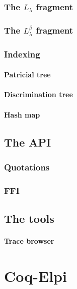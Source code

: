 \documentclass[a4paper, 11pt]{book}
\begin{document}
\cite{dunchev15lpar}

\subsection{The $L_{\lambda}$ fragment}
\subsection{The $L_{\lambda}^{\beta}$ fragment}

\cite{Michaylov1993HigherOrderLP}

\subsection{Indexing}
\subsubsection{Patricial tree}
\subsubsection{Discrimination tree}
\subsubsection{Hash map}

\section{The API}

\subsection{Quotations}
\subsection{FFI}
\section{The tools}

\subsubsection{Trace browser}

\chapter{Coq-Elpi}
\end{document}
